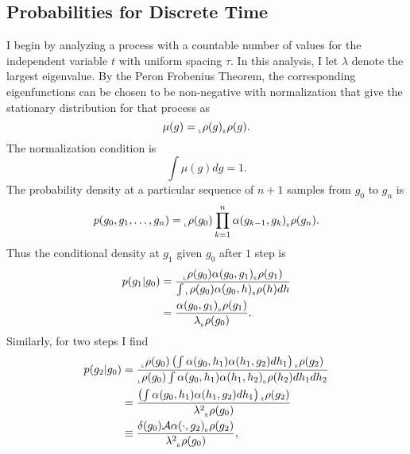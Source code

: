 \documentclass[12pt]{article} \usepackage{amsmath,amsfonts}
\newcommand{\Aop}{{\cal A}}
\newcommand{\Aindicate}{\alpha}
\newcommand{\density}{p}
\newcommand{\stationary}{\mu}
\newcommand{\rightfunction}{{_{_{\scalebox{.4}{R}}} \rho}}
\newcommand{\leftfunction}{{_{_{\scalebox{.4}{L}}} \rho}}
\begin{document}
\subsection{Probabilities for Discrete Time}
\label{sec:discrete_t}

I begin by analyzing a process with a countable number of values for
the independent variable $t$ with uniform spacing $\tau$.  In this
analysis, I let $\lambda$ denote the largest eigenvalue.  By the Peron
Frobenius Theorem, the corresponding eigenfunctions can be chosen to
be non-negative with normalization that give the stationary
distribution for that process as
\begin{equation}
  \label{eq:stationary}
  \stationary(g) = \leftfunction(g) \rightfunction(g).
\end{equation}
The normalization condition is
\begin{equation*}
  \int \stationary(g) dg = 1.
\end{equation*}
The probability density at a particular sequence of $n+1$ samples from
$g_0$ to $g_n$ is
\begin{equation}
  \label{eq:joint}
  \density(g_0, g_1, \ldots , g_n) = \leftfunction(g_0) \prod_{k=1}^n
  \Aindicate(g_{k-1},g_k) \rightfunction(g_n).
\end{equation}
Thus the conditional density at $g_1$ given $g_0$ after $1$ step is
\begin{align}
  \density(g_1 | g_0) &= \frac{\leftfunction(g_0)
  \Aindicate(g_0,g_1) \rightfunction(g_1)}{ \int \leftfunction(g_0)
  \Aindicate(g_0,h) \rightfunction(h) dh} \nonumber \\
  \label{eq:one_step}
  &= \frac{\Aindicate(g_0,g_1)
    \rightfunction(g_1)}{\lambda \rightfunction(g_0)}.
\end{align}
Similarly, for two steps I find
\begin{align}
  \density(g_2 | g_0) &= \frac{\leftfunction(g_0) \left( \int
      \Aindicate(g_0,h_1) \Aindicate(h_1,g_2) dh_1 \right)
      \rightfunction(g_2) } 
      { \leftfunction(g_0) \int
      \Aindicate(g_0,h_1) \Aindicate(h_1,h_2) \rightfunction(h_2) dh_1
      dh_2} \nonumber \\
  &= \frac{ \left( \int
      \Aindicate(g_0,h_1) \Aindicate(h_1,g_2) dh_1 \right)
      \rightfunction(g_2) } 
      { \lambda^2  \rightfunction(g_0)} \nonumber \\
  \label{eq:two_step}
  &\equiv \frac{\delta(g_0) \Aop \Aindicate(\cdot,g_2)
    \rightfunction(g_2)}{\lambda^2 \rightfunction(g_0)},
\end{align}
\end{document}
